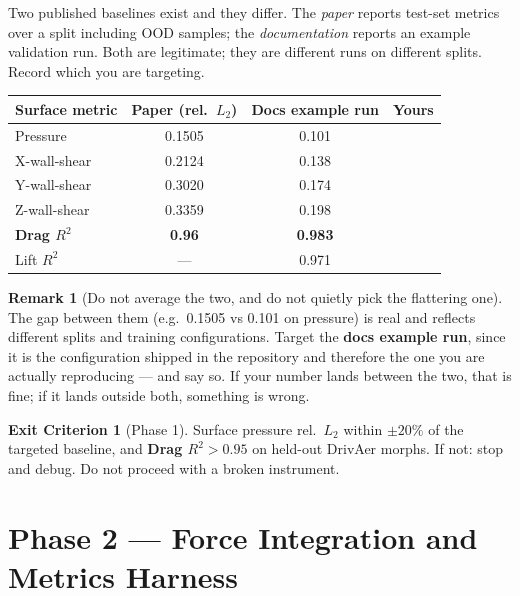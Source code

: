 \documentclass[10pt,a4paper]{article}
\theoremstyle{definition}
\newtheorem{criterion}{Exit Criterion}[section]
\newtheorem{remark}{Remark}[section]
\begin{document}
Two published baselines exist and they differ. The \emph{paper} reports test-set
metrics over a split including OOD samples; the \emph{documentation} reports an
example validation run. Both are legitimate; they are different runs on different
splits. Record which you are targeting.

\begin{center}\small
\begin{tabular}{@{}lccc@{}}
\toprule
\textbf{Surface metric} & \textbf{Paper (rel.\ $L_2$)} & \textbf{Docs example run} & \textbf{Yours} \\
\midrule
Pressure         & 0.1505 & 0.101 & \\
X-wall-shear     & 0.2124 & 0.138 & \\
Y-wall-shear     & 0.3020 & 0.174 & \\
Z-wall-shear     & 0.3359 & 0.198 & \\
\midrule
\textbf{Drag $R^2$} & \textbf{0.96} & \textbf{0.983} & \\
Lift $R^2$       & --- & 0.971 & \\
\bottomrule
\end{tabular}
\end{center}

\begin{remark}[Do not average the two, and do not quietly pick the flattering one]
The gap between them (e.g.\ 0.1505 vs 0.101 on pressure) is real and reflects
different splits and training configurations. Target the \textbf{docs example run},
since it is the configuration shipped in the repository and therefore the one you are
actually reproducing --- and say so. If your number lands between the two, that is
fine; if it lands outside both, something is wrong.
\end{remark}

\begin{criterion}[Phase 1]
\label{crit:p1}
Surface pressure rel.\ $L_2$ within $\pm 20\%$ of the targeted baseline, and
\textbf{Drag $R^2 > 0.95$} on held-out DrivAer morphs. If not: stop and debug. Do not
proceed with a broken instrument.
\end{criterion}

\section{Phase 2 --- Force Integration and Metrics Harness}
\label{sec:phase2}
\end{document}
